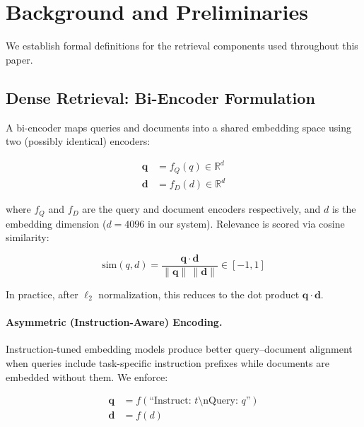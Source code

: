 \documentclass[11pt]{article}
\begin{document}
\section{Background and Preliminaries}
\label{sec:background}

We establish formal definitions for the retrieval components used throughout this paper.

\subsection{Dense Retrieval: Bi-Encoder Formulation}

A bi-encoder \citep{karpukhin2020dpr} maps queries and documents into a shared embedding
space using two (possibly identical) encoders:

\begin{align}
  \mathbf{q} &= f_Q(q) \in \mathbb{R}^d \\
  \mathbf{d} &= f_D(d) \in \mathbb{R}^d
\end{align}

where $f_Q$ and $f_D$ are the query and document encoders respectively, and $d$ is the
embedding dimension ($d=4096$ in our system). Relevance is scored via cosine similarity:

\begin{equation}
  \text{sim}(q, d) = \frac{\mathbf{q} \cdot \mathbf{d}}{\|\mathbf{q}\|\,\|\mathbf{d}\|}
  \in [-1, 1]
\end{equation}

In practice, after $\ell_2$ normalization, this reduces to the dot product
$\mathbf{q} \cdot \mathbf{d}$.

\paragraph{Asymmetric (Instruction-Aware) Encoding.}
Instruction-tuned embedding models \citep{su2022instructor} produce better
query--document alignment when queries include task-specific instruction prefixes while
documents are embedded without them. We enforce:

\begin{align}
  \mathbf{q} &= f\!\left(\text{``Instruct: } t \text{\textbackslash nQuery: } q\text{''}\right) \\
  \mathbf{d} &= f(d)
\end{align}
\end{document}
